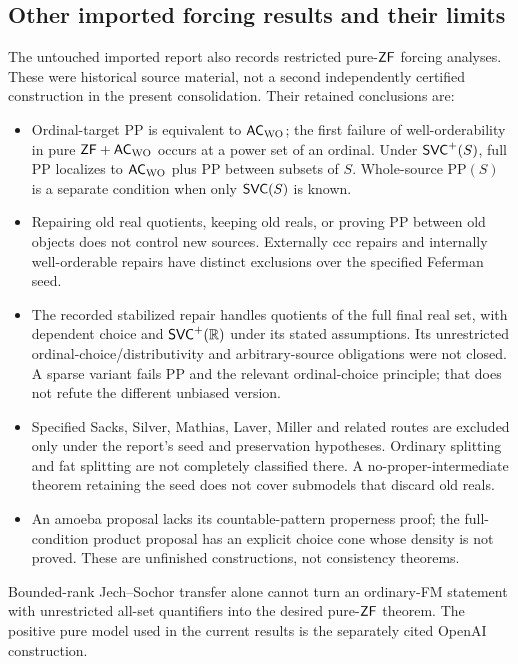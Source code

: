 \subsection{Other imported forcing results and their limits}
The untouched imported report also records restricted pure-$\mathsf{ZF}$ forcing analyses. These were historical source material, not a second independently certified construction in the present consolidation. Their retained conclusions are:
\begin{itemize}
\item Ordinal-target PP is equivalent to $\mathsf{AC}_{\mathrm{WO}}$; the first failure of well-orderability in pure $\mathsf{ZF}+\mathsf{AC}_{\mathrm{WO}}$ occurs at a power set of an ordinal. Under $\mathsf{SVC}^+(S)$, full PP localizes to $\mathsf{AC}_{\mathrm{WO}}$ plus PP between subsets of $S$. Whole-source PP$(S)$ is a separate condition when only $\mathsf{SVC}(S)$ is known.
\item Repairing old real quotients, keeping old reals, or proving PP between old objects does not control new sources. Externally ccc repairs and internally well-orderable repairs have distinct exclusions over the specified Feferman seed.
\item The recorded stabilized repair handles quotients of the full final real set, with dependent choice and $\mathsf{SVC}^+(\mathbb R)$ under its stated assumptions. Its unrestricted ordinal-choice/distributivity and arbitrary-source obligations were not closed. A sparse variant fails PP and the relevant ordinal-choice principle; that does not refute the different unbiased version.
\item Specified Sacks, Silver, Mathias, Laver, Miller and related routes are excluded only under the report's seed and preservation hypotheses. Ordinary splitting and fat splitting are not completely classified there. A no-proper-intermediate theorem retaining the seed does not cover submodels that discard old reals.
\item An amoeba proposal lacks its countable-pattern properness proof; the full-condition product proposal has an explicit choice cone whose density is not proved. These are unfinished constructions, not consistency theorems.
\end{itemize}
Bounded-rank Jech--Sochor transfer alone cannot turn an ordinary-FM statement with unrestricted all-set quantifiers into the desired pure-$\mathsf{ZF}$ theorem. The positive pure model used in the current results is the separately cited OpenAI construction.
